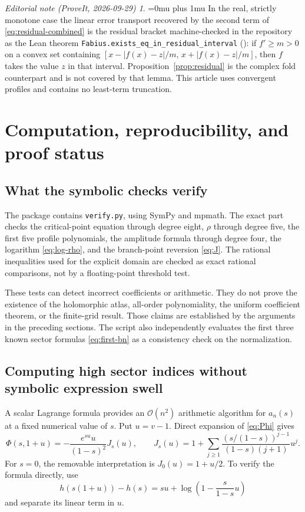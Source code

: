 \documentclass[11pt,a4paper]{article}
\theoremstyle{definition}
\theoremstyle{remark}
\newtheorem*{ednoteinner}{Editorial note (ProveIt, 2026-09-29)}
\newenvironment{ednote}{\begin{ednoteinner}\sloppy\Urlmuskip=0mu plus 1mu\relax}{\end{ednoteinner}}
\newcommand{\OO}{\mathcal O}
\begin{document}
\begin{ednote}
In the real, strictly monotone case the linear error transport recovered
by the second term of \eqref{eq:residual-combined} is the residual bracket
machine-checked in the repository as the Lean theorem
\texttt{Fabius.exists\_eq\_in\_residual\_interval}
():
if $f'\ge m>0$ on a convex set containing
$[x-|f(x)-z|/m,\,x+|f(x)-z|/m]$, then $f$ takes the value $z$ in that
interval. Proposition~\ref{prop:residual} is the complex fold counterpart
and is not covered by that lemma. This article uses convergent profiles and
contains no least-term truncation.
\end{ednote}

\section{Computation, reproducibility, and proof status}
\label{sec:computation}

\subsection{What the symbolic checks verify}
The package contains \texttt{verify.py}, using SymPy and mpmath. The
exact part checks the critical-point equation through degree eight,
$\rho$ through degree five, the first five profile polynomials, the
amplitude formula through degree four, the logarithm
\eqref{eq:log-rho}, and the branch-point reversion \eqref{eq:J}.
The rational inequalities used for the explicit domain are checked as
exact rational comparisons, not by a floating-point threshold test.

These tests can detect incorrect coefficients or arithmetic. They do not
prove the existence of the holomorphic atlas, all-order polynomiality,
the uniform coefficient theorem, or the finite-grid result. Those claims
are established by the arguments in the preceding sections. The script
also independently evaluates the first three known sector formulas
\eqref{eq:first-bn} as a consistency check on the normalization.

\subsection{Computing high sector indices without symbolic expression swell}
A scalar Lagrange formula provides an $\OO(n^2)$ arithmetic algorithm for
$a_n(s)$ at a fixed numerical value of $s$. Put $u=v-1$. Direct expansion
of \eqref{eq:Phi} gives
\begin{equation}\label{eq:J-unit}
 \Phi(s,1+u)=-\frac{e^{su}u}{(1-s)^2}J_s(u),\qquad
 J_s(u)=1+\sum_{j\ge1}
     \frac{(s/(1-s))^{j-1}}{(1-s)(j+1)}u^j.
\end{equation}
For $s=0$, the removable interpretation is $J_0(u)=1+u/2$.
To verify the formula directly, use
\[
 h(s(1+u))-h(s)
 =su+\log\left(1-\frac{s}{1-s}u\right)
\]
and separate its linear term in $u$.
\end{document}
